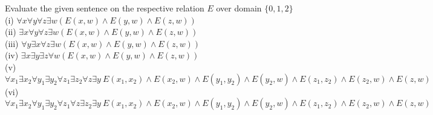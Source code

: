 \documentclass[12pt]{fphw}
\begin{document}
\begin{problem}
  Evaluate the given sentence on the respective relation $E$ over domain $\{0,1,2\}$ \\
  (i) $\forall x \forall y \forall z \exists w (E(x,w) \wedge E(y,w) \wedge E(z,w))$ \\
  (ii) $\exists x \forall y \forall z \exists w (E(x,w) \wedge E(y,w) \wedge E(z,w))$ \\
  (iii) $\forall y \exists x \forall z \exists w (E(x,w) \wedge E(y,w) \wedge E(z,w))$ \\
  (iv) $\exists x \exists y \exists z \forall w (E(x,w) \wedge E(y,w) \wedge E(z,w))$ \\
  (v) $\forall x_1 \exists x_2 \forall y_1 \exists y_2 \forall z_1 \exists z_2 \forall z \exists y \ E(x_1, x_2) \wedge E(x_2, w) \wedge E(y_1, y_2) \wedge E(y_2, w) \wedge E(z_1, z_2) \wedge E(z_2, w) \wedge E(z,w)$ \\
  (vi) $\forall x_1 \exists x_2 \forall y_1 \exists y_2 \forall z_1 \forall z \exists z_2 \exists y \ E(x_1, x_2) \wedge E(x_2, w) \wedge E(y_1, y_2) \wedge E(y_2, w) \wedge E(z_1, z_2) \wedge E(z_2, w) \wedge E(z,w)$
\end{problem}
\end{document}
